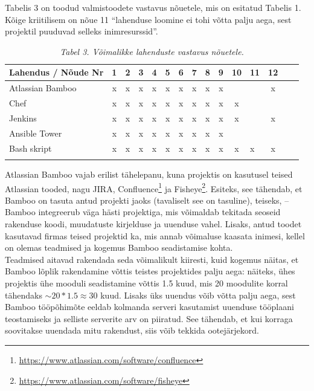\documentclass[12pt]{report}
\begin{document}
  Tabelis 3 on toodud valmistoodete vastavus nõuetele, mis on esitatud Tabelis 1. Kõige kriitilisem on nõue 11 ``lahenduse loomine ei tohi võtta palju aega, sest projektil puuduvad selleks inimresurssid''.
  
  \begin{table}[H]
    \caption*{\textit{Tabel 3. Võimalikke lahenduste vastavus nõuetele.}}
    
    \begin{tabular}{ |l|c|c|c|c|c|c|c|c|c|c V{4} c V{4} c| }
      \hline
      \textbf{Lahendus / Nõude Nr} & \textbf{1} & \textbf{2} & \textbf{3} & \textbf{4} & \textbf{5} & \textbf{6} & \textbf{7} & \textbf{8} & \textbf{9} & \textbf{10} & \textbf{11} & \textbf{12}\\
      \hline
      Atlassian Bamboo & x & x & x & x & x & x & x & x & x & & & x\\
      \hline
      Chef & x & x & x & x & x & x & x & x & x & x & & \\
      \hline
      Jenkins & x & x & x & x & x & x & x & x & x & x & & x\\
      \hline
      Ansible Tower & x & x & x & x & x & x & x & x & x & & & \\
      \hline
      Bash skript & x & x & x & x & x & x & x & x & x & x & x & x\\
      \hline
    \end{tabular}
  \end{table}

  Atlassian Bamboo vajab erilist tähelepanu, kuna projektis on kasutusel teised Atlassian tooded, nagu JIRA, Confluence\footnote{\url{https://www.atlassian.com/software/confluence}} ja Fisheye\footnote{\url{https://www.atlassian.com/software/fisheye}}. Esiteks, see tähendab, et Bamboo on tasuta antud projekti jaoks (tavaliselt see on tasuline), teiseks, \--- Bamboo integreerub väga hästi projektiga, mis võimaldab tekitada seoseid rakenduse koodi, muudatuste kirjelduse ja uuenduse vahel. Lisaks, antud toodet kasutavad firmas teised projektid ka, mis annab võimaluse kaasata inimesi, kellel on olemas teadmised ja kogemus Bamboo seadistamise kohta.\\
  
  Teadmised aitavad rakendada seda võimalikult kiiresti, kuid kogemus näitas, et Bamboo lõplik rakendamine võttis teistes projektides palju aega: näiteks, ühes projektis ühe mooduli seadistamine võttis 1.5 kuud, mis 20 moodulite korral tähendaks $\sim20*1.5 \approx 30$ kuud. Lisaks üks uuendus võib võtta palju aega, sest Bamboo tööpõhimõte eeldab kolmanda serveri kasutamist uuenduse tööplaani teostamiseks ja selliste serverite arv on piiratud. See tähendab, et kui korraga soovitakse uuendada mitu rakendust, siis võib tekkida ootejärjekord.\\
  
\end{document}
